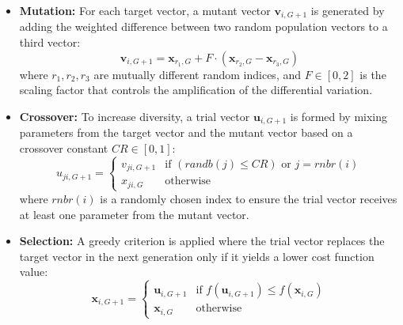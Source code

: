 \begin{itemize}
    \item \textbf{Mutation:} For each target vector, a mutant vector $\mathbf{v}_{i,G+1}$ is generated by adding the weighted difference between two random population vectors to a third vector:
    \begin{equation}
        \mathbf{v}_{i,G+1} = \mathbf{x}_{r_1,G} + F \cdot (\mathbf{x}_{r_2,G} - \mathbf{x}_{r_3,G})
    \end{equation}
    where $r_1, r_2, r_3$ are mutually different random indices, and $F \in [0, 2]$ is the scaling factor that controls the amplification of the differential variation.
    
    \item \textbf{Crossover:} To increase diversity, a trial vector $\mathbf{u}_{i,G+1}$ is formed by mixing parameters from the target vector and the mutant vector based on a crossover constant $CR \in [0, 1]$:
    \begin{equation}
        u_{ji,G+1} = 
        \begin{cases} 
        v_{ji,G+1} & \text{if } (randb(j) \le CR) \text{ or } j = rnbr(i) \\ 
        x_{ji,G} & \text{otherwise} 
        \end{cases}
    \end{equation}
    where $rnbr(i)$ is a randomly chosen index to ensure the trial vector receives at least one parameter from the mutant vector.
    
    \item \textbf{Selection:} A greedy criterion is applied where the trial vector replaces the target vector in the next generation only if it yields a lower cost function value:
    \begin{equation}
        \mathbf{x}_{i,G+1} = 
        \begin{cases} 
        \mathbf{u}_{i,G+1} & \text{if } f(\mathbf{u}_{i,G+1}) \le f(\mathbf{x}_{i,G}) \\ 
        \mathbf{x}_{i,G} & \text{otherwise} 
        \end{cases}
    \end{equation}
\end{itemize}



